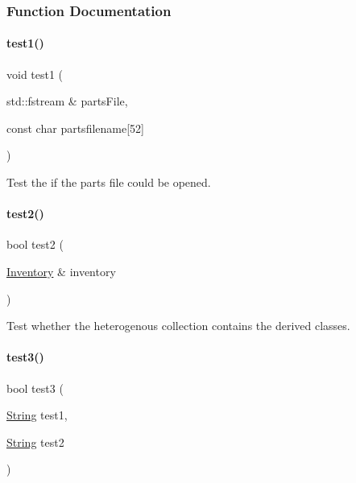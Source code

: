 \subsubsection{Function Documentation}
\mbox{\label{atest_8h_a377b49f7a65ef678441feafbbb111fd0}} 
\paragraph{\texorpdfstring{test1()}{test1()}}
{\footnotesize\ttfamily void test1 (\begin{DoxyParamCaption}\item[{std\+::fstream \&}]{parts\+File,  }\item[{const char}]{partsfilename\mbox{[}52\mbox{]} }\end{DoxyParamCaption})}



Test the if the parts file could be opened. 

\mbox{\label{atest_8h_a4e5e4ea94633fee304b7f4490e655591}} 
\paragraph{\texorpdfstring{test2()}{test2()}}
{\footnotesize\ttfamily bool test2 (\begin{DoxyParamCaption}\item[{\mbox{\hyperlink{class_inventory}{Inventory}} \&}]{inventory }\end{DoxyParamCaption})}



Test whether the heterogenous collection contains the derived classes. 

\mbox{\label{atest_8h_a6e6df2af48d16780853d6eddcb8c8bc4}} 
\paragraph{\texorpdfstring{test3()}{test3()}}
{\footnotesize\ttfamily bool test3 (\begin{DoxyParamCaption}\item[{\mbox{\hyperlink{class_string}{String}}}]{test1,  }\item[{\mbox{\hyperlink{class_string}{String}}}]{test2 }\end{DoxyParamCaption})}



